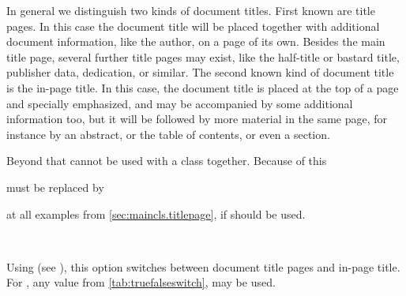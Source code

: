 In general we distinguish two kinds of document titles. First known are title
pages. In this case the document title will be placed together with additional
document information, like the author, on a page of its own. Besides the main
title page, several further title pages may exist, like the half-title or
bastard title, publisher data, dedication, or similar. The second known kind
of document title is the in-page title. In this case, the document title is
placed at the top of a page and specially emphasized, and may be accompanied
by some additional information too, but it will be followed by more material
in the same page, for instance by an abstract, or the table of contents, or
even a section.
\fi %

\ifIgnoreThis %
Beyond that  cannot be used with a \KOMAScript{}
class together. Because of this
must be replaced by
at all examples from \autoref{sec:maincls.titlepage}, if 
should be used.
\else %

\begin{Declaration}
  \\
\end{Declaration}%
%
%
Using  (see ), this option switches between document title pages
and in-page title. For , any value from 
\autoref{tab:truefalseswitch},  may be used.

